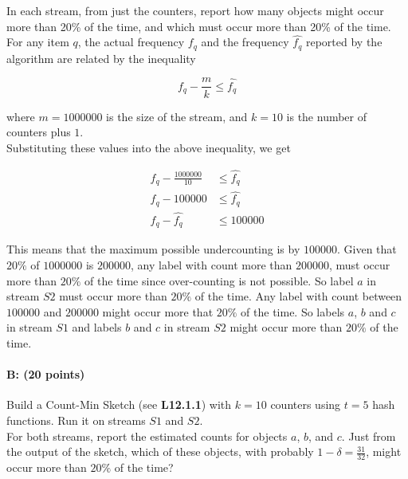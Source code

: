 \documentclass[11pt]{article}
\begin{document}
In each stream, from just the counters, report how many objects might occur more than 20\% of the time, and which must occur more than 20\% of the time. \\

For any item $q$, the actual frequency $f_q$ and the frequency $\hat{f_q}$ reported by the algorithm are related by the inequality

$$
f_q - \frac{m}{k} \leq \hat{f_q}
$$

where $m=\num[group-separator={,}]{1000000}$ is the size of the stream, and $k=10$ is the number of counters plus $1$.\\
Substituting these values into the above inequality, we get

\begin{equation*}
\begin{aligned}
f_q - \frac{\num[group-separator={,}]{1000000}}{10} &\leq \hat{f_q}\\
f_q - \num[group-separator={,}]{100000} &\leq \hat{f_q}\\
f_q - \hat{f_q}  &\leq \num[group-separator={,}]{100000}
\end{aligned}
\end{equation*}

This means that the maximum possible undercounting is by $\num[group-separator={,}]{100000}$. Given that $20\%$ of $\num[group-separator={,}]{1000000}$ is $\num[group-separator={,}]{200000}$, any label with count more than $\num[group-separator={,}]{200000}$, must occur more than $20\%$ of the time since over-counting is not possible. So label $a$ in stream $S2$ must occur more than $20\%$ of the time. Any label with count between $\num[group-separator={,}]{100000}$ and $\num[group-separator={,}]{200000}$ might occur more that $20\%$ of the time. So labels $a$, $b$ and $c$ in stream $S1$ and labels $b$ and $c$ in stream $S2$ might occur more than $20\%$ of the time.

\paragraph{B: (20 points)}  
Build a Count-Min Sketch (see \textbf{L12.1.1}) with $k = 10$ counters using $t = 5$ hash functions. Run it on streams $S1$ and $S2$.\\
For both streams, report the estimated counts for objects $a$, $b$, and $c$. Just from the output of the sketch, which of these objects, with probably $1 - \delta = \frac{31}{32}$, might occur more than $20\%$ of the time?\\
\end{document}
